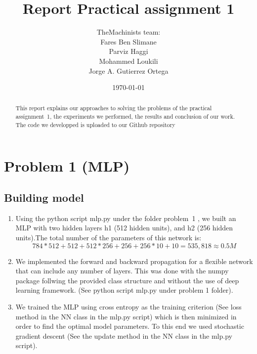 \documentclass[a4paper]{article}
\title{Report Practical assignment 1}
\author{TheMachinists team:\vspace{0.5cm}\\
Fares Ben Slimane \\
Parviz Haggi \\
Mohammed Loukili \\
Jorge A. Gutierrez Ortega
}
\date{\today}
\begin{document}
\maketitle

\begin{abstract}
This report explains our approaches to solving the problems of the practical assignment~1, the experiments we performed, the results and conclusion of our work. The code we developped is uploaded to our Github repository \cite{github}
\end{abstract}

\section{Problem 1 (MLP)}
\label{sec:problem1}

\subsection{Building model}

\begin{enumerate}
  \item Using the python script mlp.py under the folder problem~1  \cite{github}, we built an MLP with two hidden layers h1 (512 hidden units), and h2 (256 hidden units).The total number of the parameters of this network is: 
  $$ 784*512 + 512 + 512*256 + 256 + 256*10 + 10 = 535,818 \approx 0.5 M$$
  
  \item We implemented the forward and backward propagation for a flexible network that can include  any number of layers. This was done with the numpy package follwing the provided class structure and without the use of deep learning framework. (See python script mlp.py under problem 1 folder).
  
  \item We trained the MLP using cross entropy as the training criterion (See loss method in the NN class in the mlp.py script) which is then minimized in order to find the optimal model parameters. To this end we used  stochastic gradient descent (See the update method in the NN class in the mlp.py script). 
  
\end{enumerate}
\end{document}
